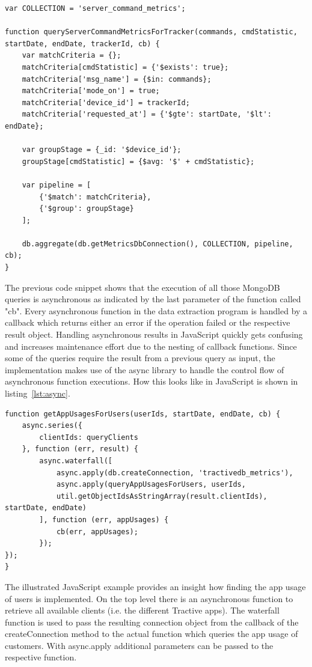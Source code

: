 \begin{lstlisting}[caption={Aggregation query on server command metrics collection},label={lst:aggregation}]
var COLLECTION = 'server_command_metrics';

function queryServerCommandMetricsForTracker(commands, cmdStatistic, startDate, endDate, trackerId, cb) {
	var matchCriteria = {};
	matchCriteria[cmdStatistic] = {'$exists': true};
	matchCriteria['msg_name'] = {$in: commands};
	matchCriteria['mode_on'] = true;
	matchCriteria['device_id'] = trackerId;
	matchCriteria['requested_at'] = {'$gte': startDate, '$lt': endDate};
	
	var groupStage = {_id: '$device_id'};
	groupStage[cmdStatistic] = {$avg: '$' + cmdStatistic};
	
	var pipeline = [
		{'$match': matchCriteria},
		{'$group': groupStage}
	];
	
	db.aggregate(db.getMetricsDbConnection(), COLLECTION, pipeline, cb);
}
\end{lstlisting}

The previous code snippet shows that the execution of all those MongoDB queries is asynchronous as indicated by the last parameter of the function called "cb". Every asynchronous function in the data extraction program is handled by a callback which returns either an error if the operation failed or the respective result object. Handling asynchronous results in JavaScript quickly gets confusing and increases maintenance effort due to the nesting of callback functions. Since some of the queries require the result from a previous query as input, the implementation makes use of the async library to handle the control flow of asynchronous function executions. How this looks like in JavaScript is shown in listing~\ref{lst:async}.

\begin{lstlisting}[caption={Example of using async for handling the control flow of asnychronous database queries}, 
label={lst:async}]
function getAppUsagesForUsers(userIds, startDate, endDate, cb) {
	async.series({
		clientIds: queryClients
	}, function (err, result) {
		async.waterfall([
			async.apply(db.createConnection, 'tractivedb_metrics'),
			async.apply(queryAppUsagesForUsers, userIds, 
			util.getObjectIdsAsStringArray(result.clientIds), startDate, endDate)
		], function (err, appUsages) {
			cb(err, appUsages);
		});
});
}
\end{lstlisting}

The illustrated JavaScript example provides an insight how finding the app usage of users is implemented. On the top level there is an asynchronous function to retrieve all available clients (i.e. the different Tractive apps). The waterfall function is used to pass the resulting connection object from the callback of the createConnection method to the actual function which queries the app usage of customers. With async.apply additional parameters can be passed to the respective function. 

